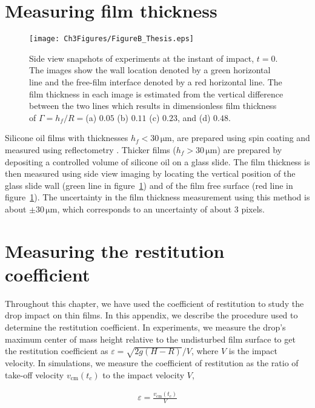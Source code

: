 \begin{subappendices}
	\section{Measuring film thickness}
	\label{sec:measuring_film_thickness}
	\begin{figure}
		\centering
		\texttt{[image: Ch3Figures/FigureB\_Thesis.eps]}
		\caption{Side view snapshots of experiments at the instant of impact, $t = 0$. The images show the wall location denoted by a green horizontal line and the free-film interface denoted by a red horizontal line. The film thickness in each image is estimated from the vertical difference between the two lines which results in dimensionless film thickness of $\Gamma = h_{f}/R = $(a) $0.05$ (b) $0.11$ (c) $0.23$, and (d) $0.48$.}
		\label{fig:figureA2a}
	\end{figure}
	
	Silicone oil films with thicknesses $h_f < 30\,\si{\micro\meter}$, are prepared using spin coating and measured using reflectometry \citep{reizman1965optical}. 
	Thicker films ($h_f > 30\,\si{\micro\meter}$) are prepared by depositing a controlled volume of silicone oil on a glass slide. 
	The film thickness is then measured using side view imaging by locating the vertical position of the glass slide wall (green line in figure~\ref{fig:figureA2a}) and of the film free surface (red line in figure~\ref{fig:figureA2a}). 
	The uncertainty in the film thickness measurement using this method is about $\pm 30\,\si{\micro\meter}$, which corresponds to an uncertainty of about 3 pixels. 
	
	
	\section{Measuring the restitution coefficient}
	\label{sec:restitution in simulations}
	
	Throughout this chapter, we have used the coefficient of restitution to study the drop impact on thin films. In this appendix, we describe the procedure used to determine the restitution coefficient. In experiments, we measure the drop's maximum center of mass height relative to the undisturbed film surface to get the restitution coefficient as $\varepsilon = \sqrt{2g(H-R)}/V$, where $V$ is the impact velocity.  
	In simulations, we measure the coefficient of restitution as the ratio of  take-off velocity $v_{\text{cm}}(t_c)$ to the impact velocity $V$,
	
	\begin{align}
		\varepsilon = \frac{v_{\text{cm}}(t_c)}{V}
	\end{align}
	

\end{subappendices}

